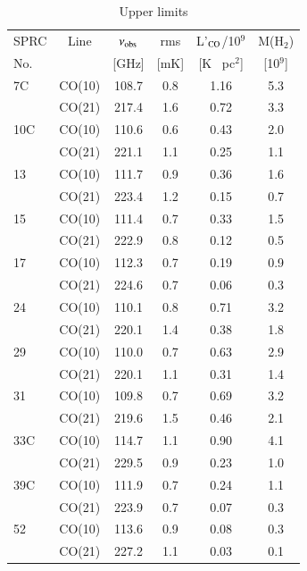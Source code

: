 \documentclass[traditabstract]{aa}
\def\ts     {\thinspace}
\def\kms    {\ifmmode{{\rm \ts km\ts s}^{-1}}\else{\ts km\ts s$^{-1}$}\fi}
\def\msol   {\ifmmode{{\rm M}_{\odot}}\else{M$_{\odot}$}\fi}
\begin{document}
\begin{table}
      \caption[]{Upper limits}
         \label{tab:uplim}
            \begin{tabular}{l c c c c c }
            \hline
            \noalign{\smallskip}
SPRC &Line&$\nu_{\rm obs}$& rms & L'$_{\rm CO}$/10$^{9}$& M(H$_2$) \\
 No.    &     & [GHz]     &  [mK]  & [K \kms\, pc$^2$] &  [10$^9$\msol]\\
            \noalign{\smallskip}
            \hline
            \noalign{\smallskip}
   7C  &  CO(10)  & 108.7  &  0.8  &  1.16  & 5.3 \\
        &  CO(21)  & 217.4  &  1.6  &  0.72  & 3.3 \\
   10C &  CO(10)  & 110.6  &  0.6  &  0.43  & 2.0 \\
        &  CO(21)  & 221.1  &  1.1  &  0.25  & 1.1 \\
   13  &  CO(10)  & 111.7  &  0.9  &  0.36  & 1.6 \\
        &  CO(21)  & 223.4  &  1.2  &  0.15  & 0.7 \\
   15  &  CO(10)  & 111.4  &  0.7  &  0.33  & 1.5 \\
        &  CO(21)  & 222.9  &  0.8  &  0.12  & 0.5 \\
   17  &  CO(10)  & 112.3  &  0.7  &  0.19  & 0.9 \\
        &  CO(21)  & 224.6  &  0.7  &  0.06  & 0.3 \\
   24  &  CO(10)  & 110.1  &  0.8  &  0.71  & 3.2 \\
        &  CO(21)  & 220.1  &  1.4  &  0.38  & 1.8 \\
   29  &  CO(10)  & 110.0  &  0.7  &  0.63  & 2.9 \\
        &  CO(21)  & 220.1  &  1.1  &  0.31  & 1.4 \\
   31  &  CO(10)  & 109.8  &  0.7  &  0.69  & 3.2 \\
        &  CO(21)  & 219.6  &  1.5  &  0.46  & 2.1 \\
   33C &  CO(10)  & 114.7  &  1.1  &  0.90  & 4.1 \\
        &  CO(21)  & 229.5  &  0.9  &  0.23  & 1.0 \\
   39C &  CO(10)  & 111.9  &  0.7  &  0.24  & 1.1 \\
        &  CO(21)  & 223.9  &  0.7  &  0.07  & 0.3 \\
   52  &  CO(10)  & 113.6  &  0.9  &  0.08  & 0.3 \\
        &  CO(21)  & 227.2  &  1.1  &  0.03  & 0.1 \\

\end{tabular}
\end{table}
\end{document}
